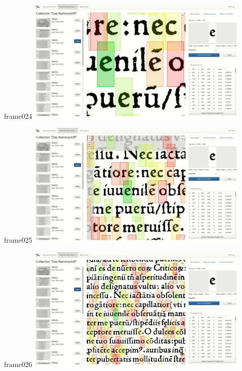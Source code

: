 \documentclass{beamer}
\begin{document}
\begin{frame}{frame024}
\includegraphics[width=0.8\textwidth]{output/exported-frames/frame024.png}
\note{}
\end{frame}

\begin{frame}{frame025}
\includegraphics[width=0.8\textwidth]{output/exported-frames/frame025.png}
\note{}
\end{frame}

\begin{frame}{frame026}
\includegraphics[width=0.8\textwidth]{output/exported-frames/frame026.png}
\note{}
\end{frame}
\end{document}
